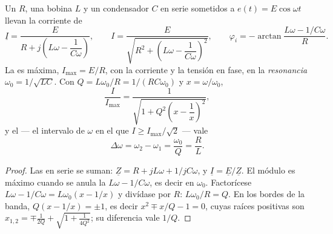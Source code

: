 \begin{theorem}\label{thm:b1:sinusoidal-impedance:resonance}
Un  $R$, una bobina $L$ y un condensador $C$ en serie sometidos a
$e(t) = E\cos\omega t$ llevan la corriente de 
\[
\underline I = \frac{E}{R + j\left(L\omega - \dfrac{1}{C\omega}\right)},
\qquad
I = \frac{E}{\sqrt{R^2 + \left(L\omega - \dfrac{1}{C\omega}\right)^2}},
\qquad
\varphi_i = -\arctan\frac{L\omega - 1/C\omega}{R} .
\]
La  es máxima, $I_{\max} = E/R$, con la corriente y la tensión en
fase, en la \emph{resonancia} $\omega_0 = 1/\sqrt{LC}$. Con
$Q = L\omega_0/R = 1/(RC\omega_0)$ y $x = \omega/\omega_0$,
\[
\frac{I}{I_{\max}} = \frac{1}{\sqrt{1 + Q^2\left(x - \dfrac1x\right)^2}} ,
\]
y el \emph{} --- el intervalo de $\omega$ en el que
$I \geq I_{\max}/\sqrt2$ --- vale
\[
\Delta\omega = \omega_2 - \omega_1 = \frac{\omega_0}{Q} = \frac{R}{L} .
\]
\end{theorem}

\begin{proof}
Las  en serie se suman: $\underline Z = R + jL\omega + 1/jC\omega$, y
$\underline I = \underline E/\underline Z$. El módulo es máximo cuando se
anula la  $L\omega - 1/C\omega$, es decir en $\omega_0$.
Factorícese $L\omega - 1/C\omega = L\omega_0(x - 1/x)$ y divídase por $R$:
$L\omega_0/R = Q$. En los bordes de la banda, $Q(x - 1/x) = \pm 1$, es decir
$x^2 \mp x/Q - 1 = 0$, cuyas raíces positivas son $x_{1,2} = \mp\frac{1}{2Q}
+ \sqrt{1 + \frac{1}{4Q^2}}$; su diferencia vale $1/Q$.
\end{proof}

